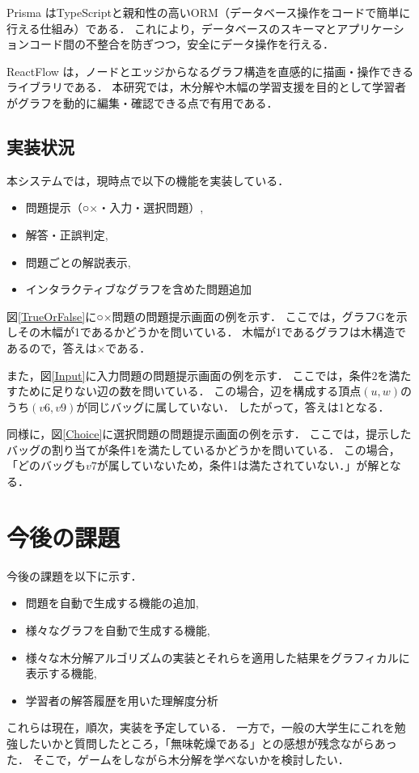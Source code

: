 \documentclass[technicalreport]{ieicej}
\begin{document}
Prisma\cite{Prisma} はTypeScriptと親和性の高いORM（データベース操作をコードで簡単に行える仕組み）である．
これにより，データベースのスキーマとアプリケーションコード間の不整合を防ぎつつ，安全にデータ操作を行える．

ReactFlow\cite{reactflow} は，ノードとエッジからなるグラフ構造を直感的に描画・操作できるライブラリである．
本研究では，木分解や木幅の学習支援を目的として学習者がグラフを動的に編集・確認できる点で有用である．

\subsection{実装状況}
本システムでは，現時点で以下の機能を実装している．
\begin{itemize}
  \item 問題提示（○×・入力・選択問題）,
  \item 解答・正誤判定,
  \item 問題ごとの解説表示,
  \item インタラクティブなグラフを含めた問題追加
\end{itemize}

図\ref{TrueOrFalse}に○×問題の問題提示画面の例を示す．
ここでは，グラフGを示しその木幅が1であるかどうかを問いている．
木幅が1であるグラフは木構造であるので，答えは×である．

また，図\ref{Input}に入力問題の問題提示画面の例を示す．
ここでは，条件2を満たすために足りない辺の数を問いている．
この場合，辺を構成する頂点$(u,w)$のうち$(v6,v9)$が同じバッグに属していない．
したがって，答えは1となる．

同様に，図\ref{Choice}に選択問題の問題提示画面の例を示す．
ここでは，提示したバッグの割り当てが条件1を満たしているかどうかを問いている．
この場合，「どのバッグも$v7$が属していないため，条件1は満たされていない．」が解となる．


\section{今後の課題}
今後の課題を以下に示す．
\begin{itemize}
  \item 問題を自動で生成する機能の追加,
  \item 様々なグラフを自動で生成する機能,
  \item 様々な木分解アルゴリズムの実装とそれらを適用した結果をグラフィカルに表示する機能,
  \item 学習者の解答履歴を用いた理解度分析
\end{itemize}
これらは現在，順次，実装を予定している．
一方で，一般の大学生にこれを勉強したいかと質問したところ，「無味乾燥である」との感想が残念ながらあった．
そこで，ゲームをしながら木分解を学べないかを検討したい．
\end{document}
